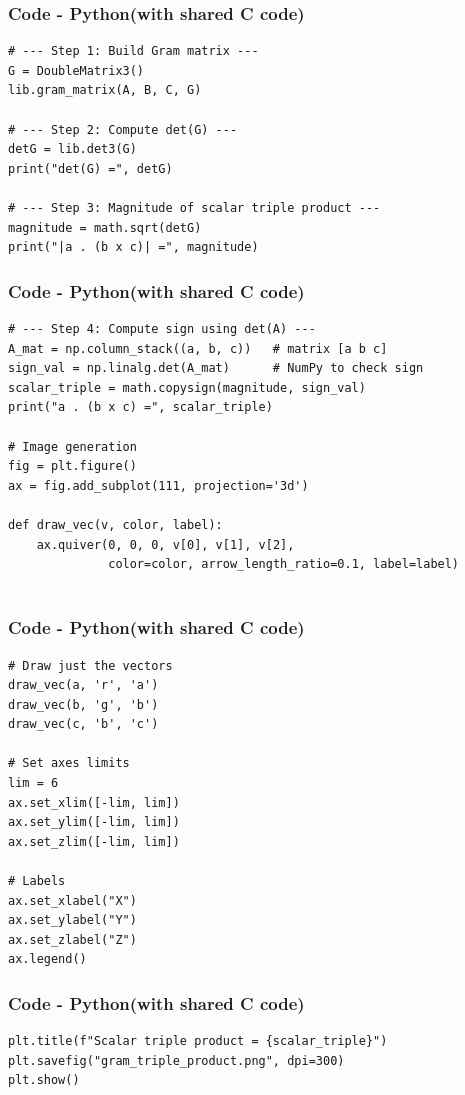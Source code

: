 \documentclass{beamer}
\theoremstyle{remark}
\numberwithin{equation}{section}
\begin{document}
\begin{frame}[fragile]
\frametitle{Code - Python(with shared C code)}
\begin{lstlisting}
# --- Step 1: Build Gram matrix ---
G = DoubleMatrix3()
lib.gram_matrix(A, B, C, G)

# --- Step 2: Compute det(G) ---
detG = lib.det3(G)
print("det(G) =", detG)

# --- Step 3: Magnitude of scalar triple product ---
magnitude = math.sqrt(detG)
print("|a . (b x c)| =", magnitude)

\end{lstlisting}
\end{frame}

\begin{frame}[fragile]
\frametitle{Code - Python(with shared C code)}
\begin{lstlisting}
# --- Step 4: Compute sign using det(A) ---
A_mat = np.column_stack((a, b, c))   # matrix [a b c]
sign_val = np.linalg.det(A_mat)      # NumPy to check sign
scalar_triple = math.copysign(magnitude, sign_val)
print("a . (b x c) =", scalar_triple)

# Image generation
fig = plt.figure()
ax = fig.add_subplot(111, projection='3d')

def draw_vec(v, color, label):
    ax.quiver(0, 0, 0, v[0], v[1], v[2],
              color=color, arrow_length_ratio=0.1, label=label)


\end{lstlisting}
\end{frame}

\begin{frame}[fragile]
\frametitle{Code - Python(with shared C code)}
\begin{lstlisting}
# Draw just the vectors
draw_vec(a, 'r', 'a')
draw_vec(b, 'g', 'b')
draw_vec(c, 'b', 'c')

# Set axes limits
lim = 6
ax.set_xlim([-lim, lim])
ax.set_ylim([-lim, lim])
ax.set_zlim([-lim, lim])

# Labels
ax.set_xlabel("X")
ax.set_ylabel("Y")
ax.set_zlabel("Z")
ax.legend()

\end{lstlisting}
\end{frame}

\begin{frame}[fragile]
\frametitle{Code - Python(with shared C code)}
\begin{lstlisting}
plt.title(f"Scalar triple product = {scalar_triple}")
plt.savefig("gram_triple_product.png", dpi=300)
plt.show()

\end{lstlisting}
\end{frame}
\end{document}
